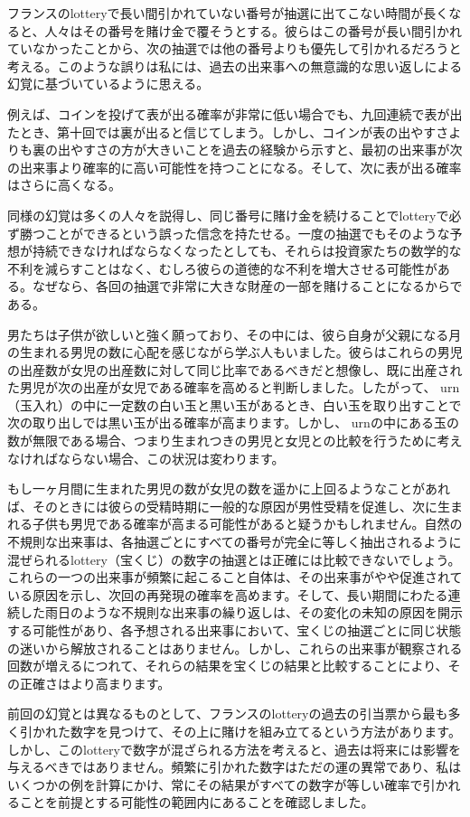 \documentclass[a4paper,11pt,openany]{ltjsbook}
\begin{document}
フランスのlotteryで長い間引かれていない番号が抽選に出てこない時間が長くなると、人々はその番号を賭け金で覆そうとする。彼らはこの番号が長い間引かれていなかったことから、次の抽選では他の番号よりも優先して引かれるだろうと考える。このような誤りは私には、過去の出来事への無意識的な思い返しによる幻覚に基づいているように思える。

例えば、コインを投げて表が出る確率が非常に低い場合でも、九回連続で表が出たとき、第十回では裏が出ると信じてしまう。しかし、コインが表の出やすさよりも裏の出やすさの方が大きいことを過去の経験から示すと、最初の出来事が次の出来事より確率的に高い可能性を持つことになる。そして、次に表が出る確率はさらに高くなる。

同様の幻覚は多くの人々を説得し、同じ番号に賭け金を続けることでlotteryで必ず勝つことができるという誤った信念を持たせる。一度の抽選でもそのような予想が持続できなければならなくなったとしても、それらは投資家たちの数学的な不利を減らすことはなく、むしろ彼らの道徳的な不利を増大させる可能性がある。なぜなら、各回の抽選で非常に大きな財産の一部を賭けることになるからである。

男たちは子供が欲しいと強く願っており、その中には、彼ら自身が父親になる月の生まれる男児の数に心配を感じながら学ぶ人もいました。彼らはこれらの男児の出産数が女児の出産数に対して同じ比率であるべきだと想像し、既に出産された男児が次の出産が女児である確率を高めると判断しました。したがって、 urn（玉入れ）の中に一定数の白い玉と黒い玉があるとき、白い玉を取り出すことで次の取り出しでは黒い玉が出る確率が高まります。しかし、 urnの中にある玉の数が無限である場合、つまり生まれつきの男児と女児との比較を行うために考えなければならない場合、この状況は変わります。


もし一ヶ月間に生まれた男児の数が女児の数を遥かに上回るようなことがあれば、そのときには彼らの受精時期に一般的な原因が男性受精を促進し、次に生まれる子供も男児である確率が高まる可能性があると疑うかもしれません。自然の不規則な出来事は、各抽選ごとにすべての番号が完全に等しく抽出されるように混ぜられるlottery（宝くじ）の数字の抽選とは正確には比較できないでしょう。これらの一つの出来事が頻繁に起こること自体は、その出来事がやや促進されている原因を示し、次回の再発現の確率を高めます。そして、長い期間にわたる連続した雨日のような不規則な出来事の繰り返しは、その変化の未知の原因を開示する可能性があり、各予想される出来事において、宝くじの抽選ごとに同じ状態の迷いから解放されることはありません。しかし、これらの出来事が観察される回数が増えるにつれて、それらの結果を宝くじの結果と比較することにより、その正確さはより高まります。

前回の幻覚とは異なるものとして、フランスのlotteryの過去の引当票から最も多く引かれた数字を見つけて、その上に賭けを組み立てるという方法があります。しかし、このlotteryで数字が混ざられる方法を考えると、過去は将来には影響を与えるべきではありません。頻繁に引かれた数字はただの運の異常であり、私はいくつかの例を計算にかけ、常にその結果がすべての数字が等しい確率で引かれることを前提とする可能性の範囲内にあることを確認しました。
\end{document}
